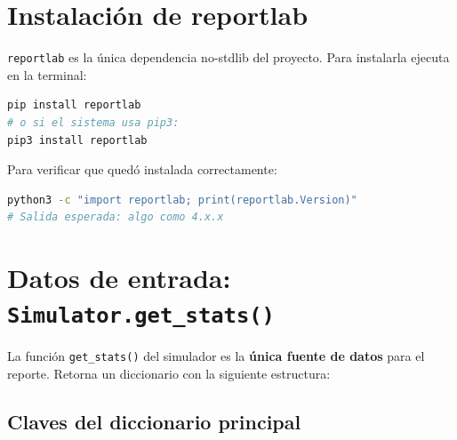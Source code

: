 \documentclass[12pt,letterpaper]{article}
\begin{document}
\section{Instalación de reportlab}

\texttt{reportlab} es la única dependencia no-stdlib del proyecto.
Para instalarla ejecuta en la terminal:

\begin{lstlisting}[language=bash, numbers=none]
pip install reportlab
# o si el sistema usa pip3:
pip3 install reportlab
\end{lstlisting}

Para verificar que quedó instalada correctamente:

\begin{lstlisting}[language=bash, numbers=none]
python3 -c "import reportlab; print(reportlab.Version)"
# Salida esperada: algo como 4.x.x
\end{lstlisting}

\section{Datos de entrada: \texttt{Simulator.get\_stats()}}

La función \texttt{get\_stats()} del simulador es la \textbf{única fuente de datos}
para el reporte. Retorna un diccionario con la siguiente estructura:

\subsection{Claves del diccionario principal}
\end{document}
